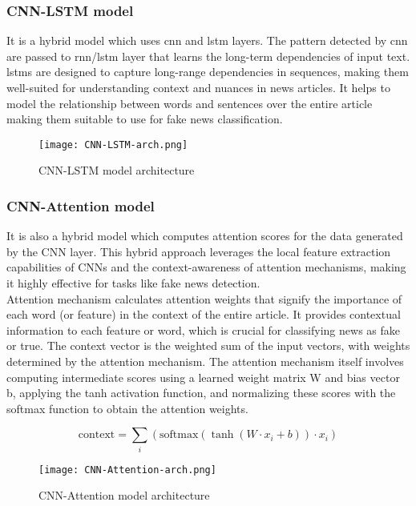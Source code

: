     \subsubsection{CNN-LSTM model}
    It is a hybrid model which uses \ac{cnn} and \ac{lstm} layers. The pattern detected by \ac{cnn} are passed to \ac{rnn}/\ac{lstm} layer that learns the long-term dependencies of input text. \\

    \ac{lstm}s are designed to capture long-range dependencies in sequences, making them well-suited for understanding context and nuances in news articles. It helps to model the relationship between words and sentences over the entire article making them suitable to use for fake news classification.
    
    \begin{figure}[h]
        \centering
        \texttt{[image: CNN-LSTM-arch.png]}
        \caption{CNN-LSTM model architecture}
        \label{fig:cnn-lstm-model-arch}
    \end{figure}

    \clearpage
    \subsubsection{CNN-Attention model}
    It is also a hybrid model which computes attention scores for the data generated by the CNN layer. This hybrid approach leverages the local feature extraction capabilities of CNNs and the context-awareness of attention mechanisms, making it highly effective for tasks like fake news detection.\\

    Attention mechanism calculates attention weights that signify the importance of each word (or feature) in the context of the entire article. It provides contextual information to each feature or word, which is crucial for classifying news as fake or true. The context vector is the weighted sum of the input vectors, with weights determined by the attention mechanism. The attention mechanism itself involves computing intermediate scores using a learned weight matrix W and bias vector b, applying the tanh activation function, and normalizing these scores with the softmax function to obtain the attention weights.

    \[
        \text{context} = \sum_i (\text{softmax}(\tanh(W \cdot x_i + b)) \cdot x_i)
    \]

    \begin{figure}[h]
        \centering
        \texttt{[image: CNN-Attention-arch.png]}
        \caption{CNN-Attention model architecture}
        \label{fig:cnn-attention-model-arch}
    \end{figure}

